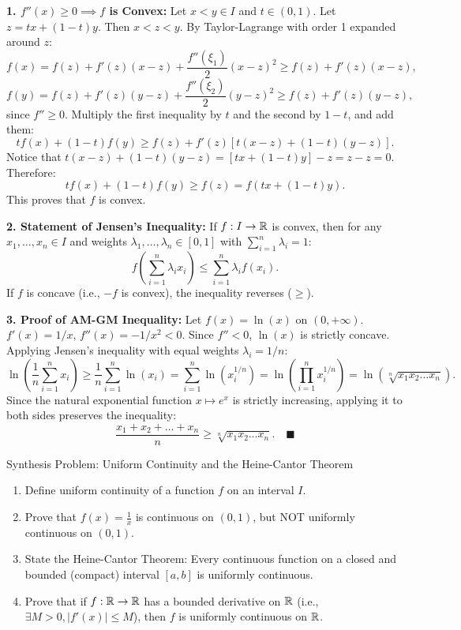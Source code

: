 \begin{solution}
\textbf{1. $f''(x) \ge 0 \implies f$ is Convex:}
Let $x < y \in I$ and $t \in (0, 1)$. Let $z = tx + (1-t)y$. Then $x < z < y$.
By Taylor-Lagrange with order 1 expanded around $z$:
\[
f(x) = f(z) + f'(z)(x - z) + \frac{f''(\xi_1)}{2}(x - z)^2 \ge f(z) + f'(z)(x - z),
\]
\[
f(y) = f(z) + f'(z)(y - z) + \frac{f''(\xi_2)}{2}(y - z)^2 \ge f(z) + f'(z)(y - z),
\]
since $f'' \ge 0$.
Multiply the first inequality by $t$ and the second by $1 - t$, and add them:
\[
t f(x) + (1-t) f(y) \ge f(z) + f'(z)[t(x - z) + (1-t)(y - z)].
\]
Notice that $t(x - z) + (1-t)(y - z) = [tx + (1-t)y] - z = z - z = 0$.
Therefore:
\[
t f(x) + (1-t) f(y) \ge f(z) = f(tx + (1-t)y).
\]
This proves that $f$ is convex.

\textbf{2. Statement of Jensen's Inequality:}
If $f: I \to \mathbb{R}$ is convex, then for any $x_1, \dots, x_n \in I$ and weights $\lambda_1, \dots, \lambda_n \in [0, 1]$ with $\sum_{i=1}^n \lambda_i = 1$:
\[
f\left(\sum_{i=1}^n \lambda_i x_i\right) \le \sum_{i=1}^n \lambda_i f(x_i).
\]
If $f$ is concave (i.e., $-f$ is convex), the inequality reverses ($\ge$).

\textbf{3. Proof of AM-GM Inequality:}
Let $f(x) = \ln(x)$ on $(0, +\infty)$.
$f'(x) = 1/x$, $f''(x) = -1/x^2 < 0$.
Since $f'' < 0$, $\ln(x)$ is strictly concave.
Applying Jensen's inequality with equal weights $\lambda_i = 1/n$:
\[
\ln\left( \frac{1}{n}\sum_{i=1}^n x_i \right) \ge \frac{1}{n} \sum_{i=1}^n \ln(x_i) = \sum_{i=1}^n \ln(x_i^{1/n}) = \ln\left( \prod_{i=1}^n x_i^{1/n} \right) = \ln\left( \sqrt[n]{x_1 x_2 \dots x_n} \right).
\]
Since the natural exponential function $x \mapsto e^x$ is strictly increasing, applying it to both sides preserves the inequality:
\[
\frac{x_1 + x_2 + \dots + x_n}{n} \ge \sqrt[n]{x_1 x_2 \dots x_n}. \quad \blacksquare
\]
\end{solution}

\begin{exercise}{Synthesis Problem: Uniform Continuity and the Heine-Cantor Theorem}
\begin{enumerate}[leftmargin=1.5em,itemsep=2pt]
  \item Define uniform continuity of a function $f$ on an interval $I$.
  \item Prove that $f(x) = \frac{1}{x}$ is continuous on $(0, 1)$, but NOT uniformly continuous on $(0, 1)$.
  \item State the Heine-Cantor Theorem: Every continuous function on a closed and bounded (compact) interval $[a, b]$ is uniformly continuous.
  \item Prove that if $f: \mathbb{R} \to \mathbb{R}$ has a bounded derivative on $\mathbb{R}$ (i.e., $\exists M > 0, |f'(x)| \le M$), then $f$ is uniformly continuous on $\mathbb{R}$.
\end{enumerate}
\end{exercise}

